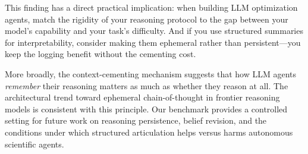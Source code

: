 \documentclass[11pt,letterpaper]{article}
\begin{document}
This finding has a direct practical implication: when building LLM
optimization agents, match the rigidity of your reasoning protocol to
the gap between your model's capability and your task's difficulty. And
if you use structured summaries for interpretability, consider making
them ephemeral rather than persistent---you keep the logging benefit
without the cementing cost.

More broadly, the context-cementing mechanism suggests that how LLM
agents \emph{remember} their reasoning matters as much as whether they
reason at all. The architectural trend toward ephemeral chain-of-thought
in frontier reasoning models is consistent with this principle. Our
benchmark provides a controlled setting for future work on reasoning
persistence, belief revision, and the conditions under which structured
articulation helps versus harms autonomous scientific agents.
\end{document}
